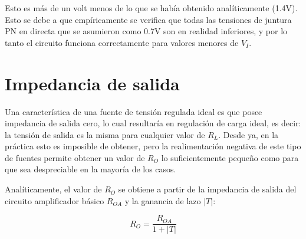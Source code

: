 \documentclass[e2_tp1_main.tex]{subfiles}
\begin{document}
Esto es m\'as de un volt menos de lo que se hab\'ia obtenido anal\'iticamente (1.4V). Esto se debe a que emp\'iricamente se verifica que todas las tensiones de juntura PN en directa que se asumieron como 0.7V son en realidad inferiores, y por lo tanto el circuito funciona correctamente para valores menores de $V_I$.


\section{Impedancia de salida}

Una caracter\'istica de una fuente de tensi\'on regulada ideal es que posee impedancia de salida cero, lo cual resultar\'ia en regulaci\'on de carga ideal, es decir: la tensi\'on de salida es la misma para cualquier valor de $R_L$. Desde ya, en la pr\'actica esto es imposible de obtener, pero la realimentaci\'on negativa de este tipo de fuentes permite obtener un valor de $R_O$ lo suficientemente peque\~no como para que sea despreciable en la mayor\'ia de los casos. 

Anal\'iticamente, el valor de $R_O$ se obtiene a partir de la impedancia de salida del circuito amplificador b\'asico $R_{OA}$ y la ganancia de lazo $|T|$:

\begin{equation}
	R_O = \frac{R_{OA}}{1+|T|}
	\label{eq:rout}
\end{equation}
\end{document}
